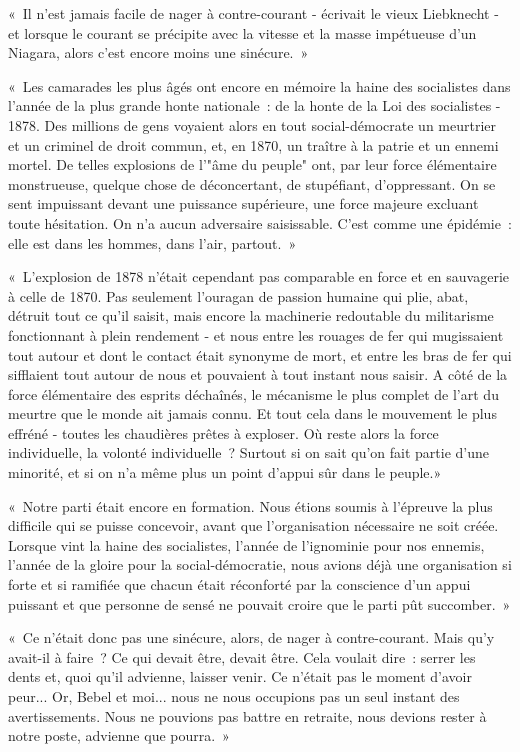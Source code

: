\documentclass[french,twoside]{book} %
\newenvironment{quoteblock}%
  {\begin{quoting}}
  {\end{quoting}}
\newenvironment{quotebar}{%
    \def\FrameCommand{{\color{rubric!10!}\vrule width 0.5em} \hspace{0.9em}}%
    \def\OuterFrameSep{\itemsep} %
    \MakeFramed {\advance\hsize-\width \FrameRestore}
  }%
  {%
    \endMakeFramed
  }
\renewenvironment{quoteblock}%
  {%
    \savenotes
    \setstretch{0.9}
    \normalfont
    \begin{quotebar}
  }
  {%
    \end{quotebar}
    \spewnotes
  }
\begin{document}
\begin{quoteblock}
 \noindent   « Il n’est jamais facile de nager à contre-courant - écrivait le vieux Liebknecht - et lorsque le courant se précipite avec la vitesse et la masse impétueuse d’un Niagara, alors c’est encore moins une sinécure. »\par
 « Les camarades les plus âgés ont encore en mémoire la haine des socialistes dans l’année de la plus grande honte nationale : de la honte de la Loi des socialistes - 1878. Des millions de gens voyaient alors en tout social-démocrate un meurtrier et un criminel de droit commun, et, en 1870, un traître à la patrie et un ennemi mortel. De telles explosions de l’"âme du peuple" ont, par leur force élémentaire monstrueuse, quelque chose de déconcertant, de stupéfiant, d’oppressant. On se sent impuissant devant une puissance supérieure, une force majeure excluant toute hésitation. On n’a aucun adversaire saisissable. C'est comme une épidémie : elle est dans les hommes, dans l’air, partout. »\par
 « L'explosion de 1878 n’était cependant pas comparable en force et en sauvagerie à celle de 1870. Pas seulement l’ouragan de passion humaine qui plie, abat, détruit tout ce qu’il saisit, mais encore la machinerie redoutable du militarisme fonctionnant à plein rendement - et nous entre les rouages de fer qui mugissaient tout autour et dont le contact était synonyme de mort, et entre les bras de fer qui sifflaient tout autour de nous et pouvaient à tout instant nous saisir. A côté de la force élémentaire des esprits déchaînés, le mécanisme le plus complet de l’art du meurtre que le monde ait jamais connu. Et tout cela dans le mouvement le plus effréné - toutes les chaudières prêtes à exploser. Où reste alors la force individuelle, la volonté individuelle ? Surtout si on sait qu’on fait partie d’une minorité, et si on n’a même plus un point d’appui sûr dans le peuple.»\par
 « Notre parti était encore en formation. Nous étions soumis à l’épreuve la plus difficile qui se puisse concevoir, avant que l’organisation nécessaire ne soit créée. Lorsque vint la haine des socialistes, l’année de l’ignominie pour nos ennemis, l’année de la gloire pour la social-démocratie, nous avions déjà une organisation si forte et si ramifiée que chacun était réconforté par la conscience d’un appui puissant et que personne de sensé ne pouvait croire que le parti pût succomber. »\par
 « Ce n’était donc pas une sinécure, alors, de nager à contre-courant. Mais qu’y avait-il à faire ? Ce qui devait être, devait être. Cela voulait dire : serrer les dents et, quoi qu’il advienne, laisser venir. Ce n’était pas le moment d’avoir peur... Or, Bebel et moi... nous ne nous occupions pas un seul instant des avertissements. Nous ne pouvions pas battre en retraite, nous devions rester à notre poste, advienne que pourra. »
\end{quoteblock}
\end{document}
